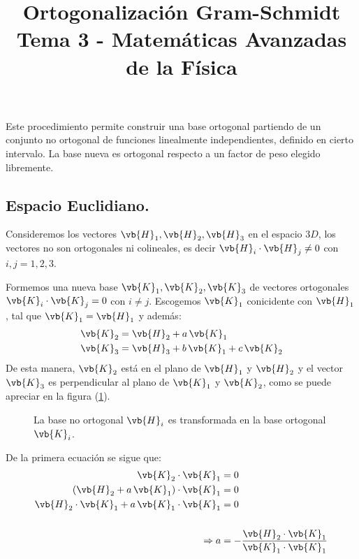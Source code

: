 
\usepackage[flushleft]{threeparttable}
\author{}
\title{Ortogonalización Gram-Schmidt \\ {\large Tema 3 - Matemáticas Avanzadas de la Física}\vspace{-3ex}}
\date{ }

\renewcommand\labelenumii{\theenumi.{\arabic{enumii}}}
\maketitle
\fontsize{14}{14}\selectfont
Este procedimiento permite construir una base ortogonal partiendo de un conjunto no ortogonal de funciones linealmente independientes, definido en cierto intervalo. La base nueva es ortogonal respecto a un factor de peso elegido libremente.
\subsection*{Espacio Euclidiano.}
Consideremos los vectores $\vb{H}_{1}, \vb{H}_{2}, \vb{H}_{3}$ en el espacio $3D$, los vectores no son ortogonales ni colineales, es decir $\vb{H}_{i} \cdot \vb{H}_{j} \neq 0$ con $i, j = 1, 2, 3$.
\par
Formemos una nueva base $\vb{K}_{1}, \vb{K}_{2}, \vb{K}_{3}$ de vectores ortogonales $\vb{K}_{i} \cdot \vb{K}_{j} = 0$ con $i \neq j$. Escogemos $\vb{K}_{1}$ conicidente con $\vb{H}_{1}$, tal que $\vb{K}_{1} = \vb{H}_{1}$ y además:
\begin{align*}
\vb{K}_{2} &= \vb{H}_{2} + a \, \vb{K}_{1} \\
\vb{K}_{3} &= \vb{H}_{3} + b \, \vb{K}_{1} + c \, \vb{K}_{2}
\end{align*}
De esta manera, $\vb{K}_{2}$ está en el plano de $\vb{H}_{1}$ y $\vb{H}_{2}$ y el vector $\vb{K}_{3}$ es perpendicular al plano de $\vb{K}_{1}$ y $\vb{K}_{2}$, como se puede apreciar en la figura (\ref{fig:figura_001}).
\par
\begin{figure}[H]
    \centering
    
    \caption{La base no ortogonal $\vb{H}_{i}$ es transformada en la base ortogonal $\vb{K}_{i}$.}
    \label{fig:figura_001}
\end{figure}
\par
De la primera ecuación se sigue que:
\begin{align*}
\vb{K}_{2} \cdot \vb{K}_{1} &= 0  \\
(\vb{H}_{2} + a \, \vb{K}_{1}) \cdot \vb{K}_{1} &= 0 \\
\vb{H}_{2} \cdot \vb{K}_{1} + a \, \vb{K}_{1} \cdot \vb{K}_{1} &= 0 \\
\\
\Rightarrow a &= - \dfrac{\vb{H}_{2} \cdot \vb{K}_{1}}{\vb{K}_{1} \cdot \vb{K}_{1}}
\end{align*}
